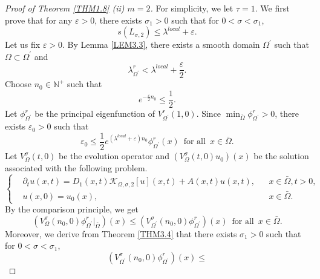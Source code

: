 \documentclass[11pt,reqno]{amsart}
\numberwithin{equation}{section}
\begin{document}
\begin{proof}[Proof of Theorem \ref{THM1.8} (ii) $\mathit{m = 2}$]
For simplicity, we let $\tau=1$.
We first prove that for any $\varepsilon>0$, there exists $\sigma_{1}>0$ such that for $0<\sigma<\sigma_{1}$,
%
\begin{equation*}
s(L_{\sigma,2}) \leq \lambda^{local} + \varepsilon.
\end{equation*}
%
Let us fix $\varepsilon>0$. By Lemma \ref{LEM3.3}, there exists a smooth domain $\Omega^{\prime}$ such that $\Omega\subset\Omega^{\prime}$ and
%
\begin{equation}\label{3-8}
\lambda^{r}_{\Omega^{\prime}} < \lambda^{local}+\frac{\varepsilon}{2}.
\end{equation}
%
Choose $n_{0}\in\mathbb{N}^{+}$ such that
%
\begin{equation}\label{3-9}
e^{-\frac{\varepsilon}{2}n_{0}}\leq \frac{1}{2}.
\end{equation}
%
Let $\phi^{r}_{\Omega^{\prime}}$ be the principal eigenfunction of $V_{\Omega^{\prime}}^{r}(1,0)$. Since $\min_{\bar{\Omega}}  \phi^{r}_{\Omega^{\prime}} >0$, there exists $\varepsilon_{0}>0$ such that
\begin{equation}\label{3-10}
\varepsilon_{0} \leq \frac{1}{2}e^{(\lambda^{local} + \varepsilon)n_{0}}\phi^{r}_{\Omega^{\prime}}(x)\enspace\text{for all}\enspace x\in\bar{\Omega}.
\end{equation}
%
Let $V^{\sigma}_{\Omega}(t,0)$ be the evolution operator and $ \left(V^{\sigma}_{\Omega}(t,0)u_{0}\right) (x)$ be the solution associated with the following problem.
\begin{equation*}
\left\{
\begin{aligned}
& \partial_{t} u(x,t)= D_{1}(x,t)\mathcal{K}_{\Omega,\sigma,2}[u](x,t) + A(x,t)u(x,t), && x\in \bar\Omega, t> 0,\\
&u(x,0)=u_{0}(x),  && x\in \bar\Omega.
\end{aligned}
\right.
\end{equation*}
By the comparison principle, we get
%
\begin{equation}\label{3-11}
(V^{\sigma}_{\Omega}(n_{0},0)\phi^{r}_{\Omega^{\prime}}|_{\bar{\Omega}})(x)
\leq
(V^{\sigma}_{\Omega^{\prime}}(n_{0},0)\phi^{r}_{\Omega^{\prime}})(x) \enspace\text{for all}\enspace x\in\bar\Omega.
\end{equation}
%
Moreover, we derive from Theorem \ref{THM3.4} that there exists $\sigma_{1}>0$ such that for $0<\sigma<\sigma_{1}$,
\begin{equation*}
(V^{\sigma}_{\Omega^{\prime}}(n_{0},0)\phi^{r}_{\Omega^{\prime}})(x) \leq

\end{equation*}
\end{proof}
\end{document}
